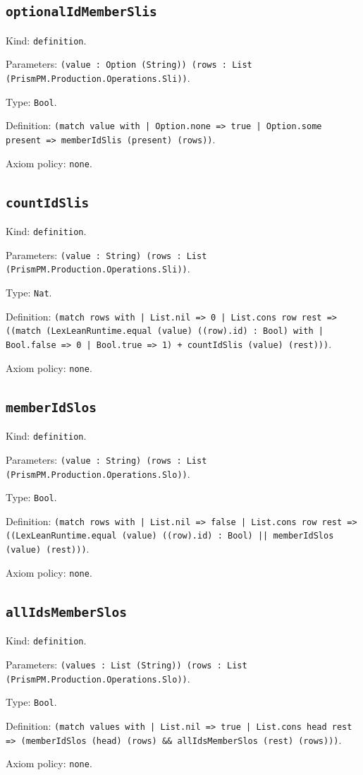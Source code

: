 \documentclass[11pt]{article}
\begin{document}
\subsection*{\texttt{optionalIdMemberSlis}}
\noindent Kind: \texttt{definition}.\par
\noindent Parameters: \texttt{(value : Option (String)) (rows : List (PrismPM.Production.Operations.Sli))}.\par
\noindent Type: \texttt{Bool}.\par
\noindent Definition: \texttt{(match value with | Option.none => true | Option.some present => memberIdSlis (present) (rows))}.\par
\noindent Axiom policy: \texttt{none}.\par
\subsection*{\texttt{countIdSlis}}
\noindent Kind: \texttt{definition}.\par
\noindent Parameters: \texttt{(value : String) (rows : List (PrismPM.Production.Operations.Sli))}.\par
\noindent Type: \texttt{Nat}.\par
\noindent Definition: \texttt{(match rows with | List.nil => 0 | List.cons row rest => ((match (LexLeanRuntime.equal (value) ((row).id) : Bool) with | Bool.false => 0 | Bool.true => 1) + countIdSlis (value) (rest)))}.\par
\noindent Axiom policy: \texttt{none}.\par
\subsection*{\texttt{memberIdSlos}}
\noindent Kind: \texttt{definition}.\par
\noindent Parameters: \texttt{(value : String) (rows : List (PrismPM.Production.Operations.Slo))}.\par
\noindent Type: \texttt{Bool}.\par
\noindent Definition: \texttt{(match rows with | List.nil => false | List.cons row rest => ((LexLeanRuntime.equal (value) ((row).id) : Bool) || memberIdSlos (value) (rest)))}.\par
\noindent Axiom policy: \texttt{none}.\par
\subsection*{\texttt{allIdsMemberSlos}}
\noindent Kind: \texttt{definition}.\par
\noindent Parameters: \texttt{(values : List (String)) (rows : List (PrismPM.Production.Operations.Slo))}.\par
\noindent Type: \texttt{Bool}.\par
\noindent Definition: \texttt{(match values with | List.nil => true | List.cons head rest => (memberIdSlos (head) (rows) \&\& allIdsMemberSlos (rest) (rows)))}.\par
\noindent Axiom policy: \texttt{none}.\par
\end{document}
